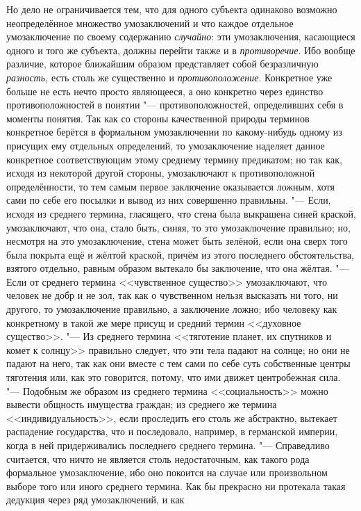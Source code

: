 Но дело не ограничивается тем, что для одного субъекта
одинаково возможно неопределённое множество умозаключений и что каждое
отдельное умозаключение по своему содержанию
{\em случайно}: эти
умозаключения, касающиеся одного и того же субъекта, должны перейти также и
в {\em противоречие}. Ибо
вообще различие, которое ближайшим образом представляет собой безразличную
{\em разность,} есть
столь же существенно и
{\em противоположение}.
Конкретное уже больше не есть нечто просто являющееся, а оно
конкретно через единство противоположностей в понятии
"--- противоположностей, определивших себя в моменты понятия.
Так как со стороны качественной природы терминов конкретное берётся в
формальном умозаключении по какому-нибудь одному из присущих ему отдельных
определений, то умозаключение наделяет данное конкретное соответствующим
этому среднему термину предикатом; но так как, исходя из некоторой другой
стороны, умозаключают к противоположной определённости, то тем самым первое
заключение оказывается ложным, хотя сами по себе его посылки и вывод из них
совершенно правильны. "--- Если, исходя из среднего термина,
гласящего, что стена была выкрашена синей краской, умозаключают, что она,
стало быть, синяя, то это умозаключение правильно; но, несмотря на это
умозаключение, стена может быть зелёной, если она сверх того была покрыта
ещё и жёлтой краской, причём из этого последнего обстоятельства, взятого
отдельно, равным образом вытекало бы заключение, что она
жёлтая. "--- Если от среднего термина <<чувственное существо>>
умозаключают, что человек не добр и не зол, так как о чувственном нельзя
высказать ни того, ни другого, то умозаключение правильно, а заключение
ложно; ибо человеку как конкретному в такой же мере присущ и средний термин
<<духовное существо>>. "--- Из среднего термина <<тяготение
планет, их спутников и комет к солнцу>> правильно следует, что эти тела
падают на солнце; но они не падают на него, так как они вместе с тем сами
по себе суть собственные центры тяготения или, как это говорится, потому,
что ими движет центробежная сила. "--- Подобным же образом из
среднего термина <<социальность>> можно вывести общность имущества граждан;
из среднего же термина <<индивидуальность>>, если проследить его столь же
абстрактно, вытекает распадение государства, что и последовало, например, в
германской империи, когда в ней придерживались последнего среднего
термина. "--- Справедливо считается, что ничто не является
столь недостаточным, как такого рода формальное умозаключение, ибо оно
покоится на случае или произвольном выборе того или иного среднего термина.
Как бы прекрасно ни протекала такая дедукция через ряд умозаключений, и как
